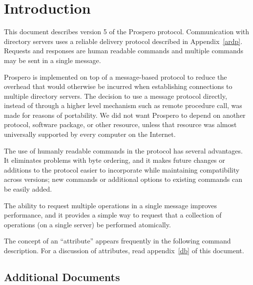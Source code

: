 \tableofcontents

\chapter{Introduction}

This document describes version 5 of the Prospero protocol.
Communication with directory servers uses a reliable delivery protocol
described in Appendix~\ref{ardp}.
Requests and responses are human readable commands and multiple
commands may be sent in a single message.

Prospero is implemented on top of a message-based protocol to reduce the
overhead that would otherwise be incurred when establishing
connections to multiple directory servers.  The decision to use a
message protocol directly, instead of through a higher level
mechanism such as remote procedure call, was made for reasons of
portability.  We did not want Prospero to depend on another protocol,
software package, or other resource, unless that resource was almost
universally supported by every computer on the Internet.

The use of humanly readable commands in the protocol has several
advantages. It eliminates problems with byte ordering, and it makes
future changes or additions to the protocol easier to incorporate
while maintaining compatibility across versions; new commands or
additional options to existing commands can be easily added.

The ability to request multiple operations in a single message
improves performance, and it provides a simple way to request that a
collection of operations (on a single server) be performed atomically.

The concept of an ``attribute'' appears frequently in the following
command description.  For a discussion of attributes, read
appendix~\ref{db} of this document.

\section{Additional Documents}

